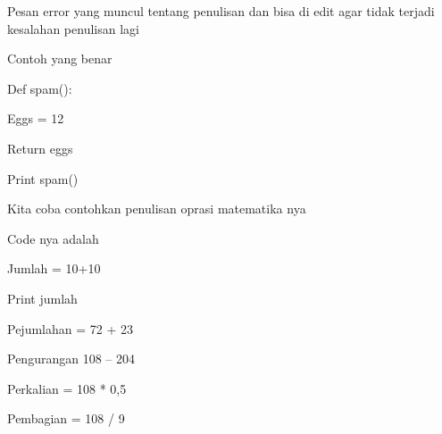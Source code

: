 \vspace{14pt}
\noindent 
{\fontsize{14pt}{14pt}\selectfont Pesan error yang muncul tentang penulisan dan bisa di edit agar tidak terjadi kesalahan penulisan lagi \\} \par
\vspace{14pt}
\noindent 
{\fontsize{14pt}{14pt}\selectfont Contoh yang benar  \\} \par
\vspace{14pt}
\noindent 
{\fontsize{14pt}{14pt}\selectfont Def spam(): \\} \par
\noindent 
{\fontsize{14pt}{14pt}\selectfont Eggs = 12 \\} \par
\noindent 
{\fontsize{14pt}{14pt}\selectfont Return eggs \\} \par
\noindent 
{\fontsize{14pt}{14pt}\selectfont Print spam() \\} \par
\vspace{14pt}
\noindent 
{\fontsize{14pt}{14pt}\selectfont Kita coba contohkan penulisan oprasi matematika nya \\} \par
\vspace{14pt}
\noindent 
{\fontsize{14pt}{14pt}\selectfont Code nya adalah  \\} \par
\vspace{14pt}
\vspace{14pt}
\noindent 
{\fontsize{14pt}{14pt}\selectfont Jumlah = 10+10 \\} \par
\noindent 
{\fontsize{14pt}{14pt}\selectfont Print jumlah \\} \par
\vspace{14pt}
\noindent 
{\fontsize{14pt}{14pt}\selectfont Pejumlahan = 72 + 23 \\} \par
\noindent 
{\fontsize{14pt}{14pt}\selectfont Pengurangan 108 – 204 \\} \par
\noindent 
{\fontsize{14pt}{14pt}\selectfont Perkalian = 108 * 0,5 \\} \par
\noindent 
{\fontsize{14pt}{14pt}\selectfont Pembagian = 108 / 9 \\} \par
